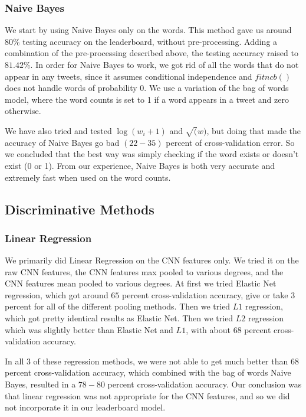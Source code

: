 \documentclass[11pt,twocolumn]{report}
\begin{document}
    \subsubsection{Naive Bayes}
    We start by using Naive Bayes only on the words. This method gave us around $80 \%$ testing accuracy on the leaderboard, without pre-processing. Adding a combination of the pre-processing described above, the testing accuracy raised to $81.42\%$. In order for Naive Bayes to work, we got rid of all the words that do not appear in any tweets, since it assumes conditional independence and $fitncb()$ does not handle words of probability $0$. We use a variation of the bag of words model, where the word counts is set to 1 if a word appears in a tweet and zero otherwise.
    \par
    We have also tried and tested $\log(w_i + 1)$ and $\sqrt(w)$, but doing that made the accuracy of Naive Bayes go bad $(22-35)$ percent of cross-validation error. So we concluded that the best way was simply checking if the word exists or doesn't exist (0 or 1). From our experience, Naive Bayes is both very accurate and extremely fast when used on the word counts.   
   
    \subsection*{Discriminative Methods}

    \subsubsection{Linear Regression}
	We primarily did Linear Regression on the CNN features only. We tried it on the raw CNN features, the CNN features max pooled to various degrees, and the CNN features mean pooled to various degrees. At first we tried Elastic Net regression, which got around $65$ percent cross-validation accuracy, give or take $3$ percent for all of the different pooling methods. Then we tried $L1$ regression, which got pretty identical results as Elastic Net. Then we tried $L2$ regression which was slightly better than Elastic Net and $L1$, with about $68$ percent cross-validation accuracy. 
    \par
    In all 3 of these regression methods, we were not able to get much better than $68$ percent cross-validation accuracy, which combined with the bag of words Naive Bayes, resulted in a $78-80$ percent cross-validation accuracy. Our conclusion was that linear regression was not appropriate for the CNN features, and so we did not incorporate it in our leaderboard model. 
    
\end{document}
